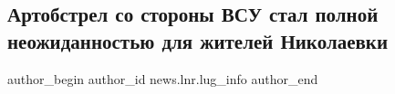  
 
 
 
 
 
\subsection{Артобстрел со стороны ВСУ стал полной неожиданностью для жителей Николаевки}
\label{sec:17_02_2022.stz.news.lnr.lug_info.1.obstrel_nikolaevka}
 
\ifcmt
 author_begin
   author_id news.lnr.lug_info
 author_end
\fi

